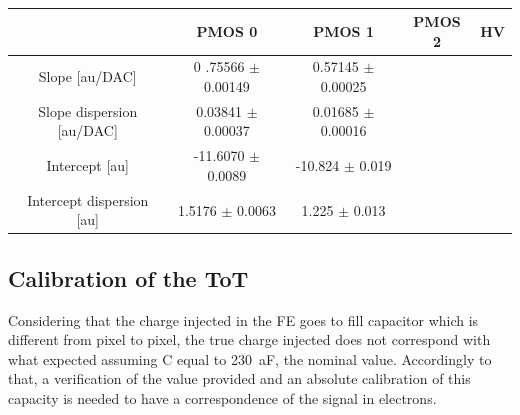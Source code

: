         \begin{table}
            \begin{center}
            \begin{tabular}{| c |  c | c | c |c |}
            \hline
            & PMOS 0 & PMOS 1 & PMOS 2 & HV \\
            \hline
            \hline
            Slope [au/DAC] & 0 .75566 $\pm$ 0.00149 & 0.57145 $\pm$ 0.00025 \\
            Slope dispersion [au/DAC] & 0.03841 $\pm$ 0.00037 & 0.01685 $\pm$ 0.00016\\
            Intercept [au] & -11.6070 $\pm$ 0.0089 & -10.824 $\pm$ 0.019 \\
            Intercept dispersion [au] & 1.5176 $\pm$ 0.0063 & 1.225 $\pm$ 0.013\\
            \hline
            \end{tabular}
            \caption{}
            \label{tab:}
            \end{center}
        \end{table}        


        \subsection{Calibration of the ToT}
        Considering that the charge injected in the FE goes to fill capacitor which is different from pixel to pixel, the true charge injected does not correspond with what expected assuming C equal to \SI{230}{aF}, the nominal value. 
        Accordingly to that, a verification of the value provided and an absolute calibration of this capacity is needed to have a correspondence of the signal in electrons. 
        
